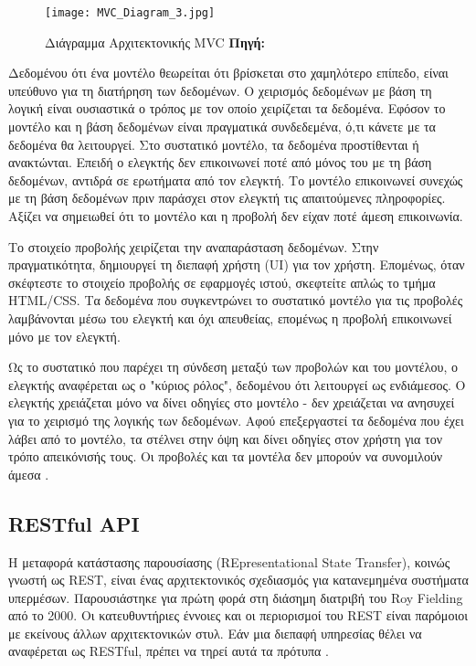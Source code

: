 \begin{figure}[h]
	\centering
	\texttt{[image: MVC\_Diagram\_3.jpg]}
	\caption[{Διάγραμμα Αρχιτεκτονικής MVC}]{Διάγραμμα Αρχιτεκτονικής MVC \textbf{Πηγή:} \cite{fig_MVC_Diagram_3}}
	\label{fig:mvc-arch}
\end{figure}

Δεδομένου ότι ένα μοντέλο θεωρείται ότι βρίσκεται στο χαμηλότερο επίπεδο, είναι υπεύθυνο για τη διατήρηση των δεδομένων. Ο χειρισμός δεδομένων με βάση τη λογική είναι ουσιαστικά ο τρόπος με τον οποίο χειρίζεται τα δεδομένα. Εφόσον το μοντέλο και η βάση δεδομένων είναι πραγματικά συνδεδεμένα, ό,τι κάνετε με τα δεδομένα θα λειτουργεί. Στο συστατικό μοντέλο, τα δεδομένα προστίθενται ή ανακτώνται. Επειδή ο ελεγκτής δεν επικοινωνεί ποτέ από μόνος του με τη βάση δεδομένων, αντιδρά σε ερωτήματα από τον ελεγκτή. Το μοντέλο επικοινωνεί συνεχώς με τη βάση δεδομένων πριν παράσχει στον ελεγκτή τις απαιτούμενες πληροφορίες. Αξίζει να σημειωθεί ότι το μοντέλο και η προβολή δεν είχαν ποτέ άμεση επικοινωνία.

Το στοιχείο προβολής χειρίζεται την αναπαράσταση δεδομένων. Στην πραγματικότητα, δημιουργεί τη διεπαφή χρήστη (UI) για τον χρήστη. Επομένως, όταν σκέφτεστε το στοιχείο προβολής σε εφαρμογές ιστού, σκεφτείτε απλώς το τμήμα HTML/CSS. Τα δεδομένα που συγκεντρώνει το συστατικό μοντέλο για τις προβολές λαμβάνονται μέσω του ελεγκτή και όχι απευθείας, επομένως η προβολή επικοινωνεί μόνο με τον ελεγκτή.

Ως το συστατικό που παρέχει τη σύνδεση μεταξύ των προβολών και του μοντέλου, ο ελεγκτής αναφέρεται ως ο "κύριος ρόλος", δεδομένου ότι λειτουργεί ως ενδιάμεσος. Ο ελεγκτής χρειάζεται μόνο να δίνει οδηγίες στο μοντέλο - δεν χρειάζεται να ανησυχεί για το χειρισμό της λογικής των δεδομένων. Αφού επεξεργαστεί τα δεδομένα που έχει λάβει από το μοντέλο, τα στέλνει στην όψη και δίνει οδηγίες στον χρήστη για τον τρόπο απεικόνισής τους. Οι προβολές και τα μοντέλα δεν μπορούν να συνομιλούν άμεσα \cite{tutorials_2022}.

\subsection{RESTful API}
Η μεταφορά κατάστασης παρουσίασης (REpresentational State Transfer), κοινώς γνωστή ως REST, είναι ένας αρχιτεκτονικός σχεδιασμός για κατανεμημένα συστήματα υπερμέσων. Παρουσιάστηκε για πρώτη φορά στη διάσημη διατριβή του Roy Fielding από το 2000.
Οι κατευθυντήριες έννοιες και οι περιορισμοί του REST είναι παρόμοιοι με εκείνους άλλων αρχιτεκτονικών στυλ. Εάν μια διεπαφή υπηρεσίας θέλει να αναφέρεται ως RESTful, πρέπει να τηρεί αυτά τα πρότυπα \cite{Gupta_2020}.

